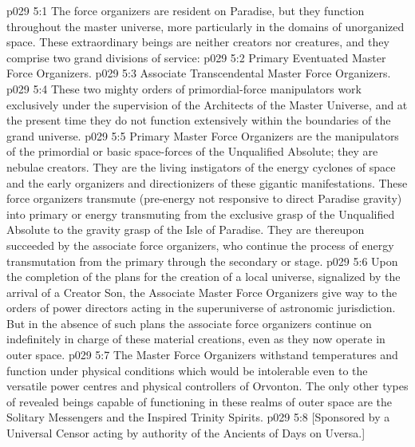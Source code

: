 \vs p029 5:1 The force organizers are resident on Paradise, but they function throughout the master universe, more particularly in the domains of unorganized space. These extraordinary beings are neither creators nor creatures, and they comprise two grand divisions of service:
\vs p029 5:2 \bibnobreakspace Primary Eventuated Master Force Organizers.
\vs p029 5:3 \bibnobreakspace Associate Transcendental Master Force Organizers.
\vs p029 5:4 \pc These two mighty orders of primordial\hyp{}force manipulators work exclusively under the supervision of the Architects of the Master Universe, and at the present time they do not function extensively within the boundaries of the grand universe.
\vs p029 5:5 \pc Primary Master Force Organizers are the manipulators of the primordial or basic space\hyp{}forces of the Unqualified Absolute; they are nebulae creators. They are the living instigators of the energy cyclones of space and the early organizers and directionizers of these gigantic manifestations. These force organizers transmute  (pre\hyp{}energy not responsive to direct Paradise gravity) into primary or  energy transmuting from the exclusive grasp of the Unqualified Absolute to the gravity grasp of the Isle of Paradise. They are thereupon succeeded by the associate force organizers, who continue the process of energy transmutation from the primary through the secondary or  stage.
\vs p029 5:6 Upon the completion of the plans for the creation of a local universe, signalized by the arrival of a Creator Son, the Associate Master Force Organizers give way to the orders of power directors acting in the superuniverse of astronomic jurisdiction. But in the absence of such plans the associate force organizers continue on indefinitely in charge of these material creations, even as they now operate in outer space.
\vs p029 5:7 The Master Force Organizers withstand temperatures and function under physical conditions which would be intolerable even to the versatile power centres and physical controllers of Orvonton. The only other types of revealed beings capable of functioning in these realms of outer space are the Solitary Messengers and the Inspired Trinity Spirits.
\vsetoff
\vs p029 5:8 [Sponsored by a Universal Censor acting by authority of the Ancients of Days on Uversa.]
\quizlink

